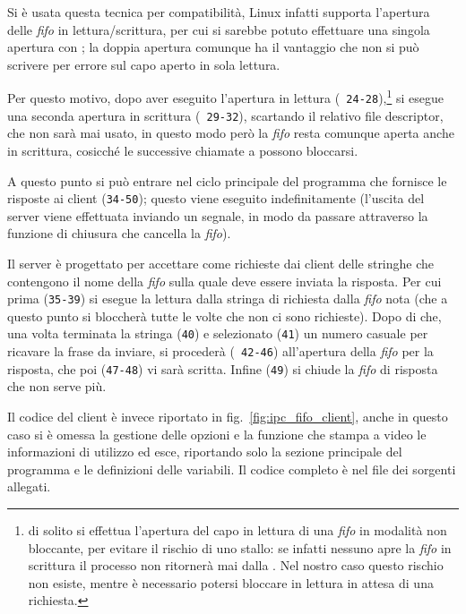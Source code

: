 Si è usata questa tecnica per compatibilità, Linux infatti supporta l'apertura
delle \textit{fifo} in lettura/scrittura, per cui si sarebbe potuto effettuare
una singola apertura con ; la doppia apertura comunque ha il
vantaggio che non si può scrivere per errore sul capo aperto in sola lettura.

Per questo motivo, dopo aver eseguito l'apertura in lettura (\texttt{\small
  24-28}),\footnote{di solito si effettua l'apertura del capo in lettura di
  una \textit{fifo} in modalità non bloccante, per evitare il rischio di uno
  stallo: se infatti nessuno apre la \textit{fifo} in scrittura il processo
  non ritornerà mai dalla . Nel nostro caso questo rischio non
  esiste, mentre è necessario potersi bloccare in lettura in attesa di una
  richiesta.}  si esegue una seconda apertura in scrittura (\texttt{\small
  29-32}), scartando il relativo file descriptor, che non sarà mai usato, in
questo modo però la \textit{fifo} resta comunque aperta anche in scrittura,
cosicché le successive chiamate a  possono bloccarsi.

A questo punto si può entrare nel ciclo principale del programma che fornisce
le risposte ai client (\texttt{\small 34-50}); questo viene eseguito
indefinitamente (l'uscita del server viene effettuata inviando un segnale, in
modo da passare attraverso la funzione di chiusura che cancella la
\textit{fifo}).

Il server è progettato per accettare come richieste dai client delle stringhe
che contengono il nome della \textit{fifo} sulla quale deve essere inviata la
risposta.  Per cui prima (\texttt{\small 35-39}) si esegue la lettura dalla
stringa di richiesta dalla \textit{fifo} nota (che a questo punto si bloccherà
tutte le volte che non ci sono richieste). Dopo di che, una volta terminata la
stringa (\texttt{\small 40}) e selezionato (\texttt{\small 41}) un numero
casuale per ricavare la frase da inviare, si procederà (\texttt{\small
  42-46}) all'apertura della \textit{fifo} per la risposta, che poi 
(\texttt{\small 47-48}) vi sarà scritta. Infine (\texttt{\small 49}) si
chiude la \textit{fifo} di risposta che non serve più.

Il codice del client è invece riportato in fig.~\ref{fig:ipc_fifo_client},
anche in questo caso si è omessa la gestione delle opzioni e la funzione che
stampa a video le informazioni di utilizzo ed esce, riportando solo la sezione
principale del programma e le definizioni delle variabili. Il codice completo
è nel file  dei sorgenti allegati.

